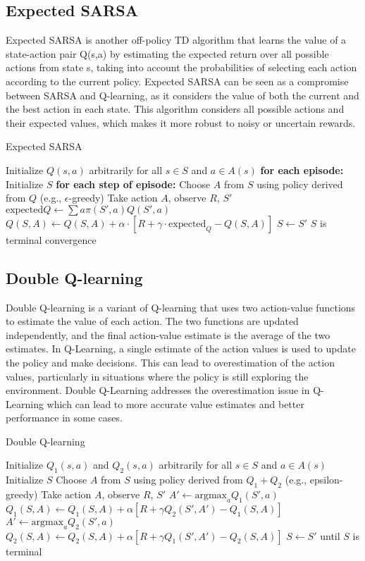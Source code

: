 \subsection{Expected SARSA}
Expected SARSA is another off-policy TD algorithm that learns the value of a state-action pair Q(s,a) by estimating the expected return over all possible actions from state s, taking into account the probabilities of selecting each action according to the current policy. Expected SARSA can be seen as a compromise between SARSA and Q-learning, as it considers the value of both the current and the best action in each state. This algorithm considers all possible actions and their expected values, which makes it more robust to noisy or uncertain rewards. 
\begin{algorithm}
\caption{Expected SARSA}\label{algo:ES}
\begin{algorithmic}[1]
\State Initialize $Q(s,a)$ arbitrarily for all $s \in S$ and $a \in A(s)$
\Repeat \textbf{for each episode:}
\State Initialize $S$
\Repeat \textbf{for each step of episode:}
\State Choose $A$ from $S$ using policy derived from $Q$ (e.g., $\epsilon$-greedy)
\State Take action $A$, observe $R$, $S'$
\State $\text{expected}Q \gets \sum{a} \pi(S',a) Q(S',a)$
\State $Q(S,A) \gets Q(S,A) + \alpha \cdot [R + \gamma \cdot \text{expected}_Q - Q(S,A)]$
\State $S \gets S'$
\Until $S$ is terminal
\Until convergence
\end{algorithmic}
\end{algorithm}


\subsection{Double Q-learning}
Double Q-learning is a variant of Q-learning that uses two action-value functions to estimate the value of each action. The two functions are updated independently, and the final action-value estimate is the average of the two estimates. In Q-Learning, a single estimate of the action values is used to update the policy and make decisions. This can lead to overestimation of the action values, particularly in situations where the policy is still exploring the environment. Double Q-Learning addresses the overestimation issue in Q-Learning which can lead to more accurate value estimates and better performance in some cases.
\begin{algorithm}
\caption{Double Q-learning}\label{algo:DQL}
\begin{algorithmic}[1]
\State Initialize $Q_1(s,a)$ and $Q_2(s,a)$ arbitrarily for all $s \in S$ and $a \in A(s)$
\State Initialize $S$
\State Choose $A$ from $S$ using policy derived from $Q_1+Q_2$ (e.g., epsilon-greedy)
\State Take action $A$, observe $R$, $S'$
\State $A' \gets \text{argmax}_a Q_1(S',a)$
\State $Q_1(S,A) \gets Q_1(S,A) + \alpha [R + \gamma Q_2(S',A') - Q_1(S,A)]$
\Else
\State $A' \gets \text{argmax}_a Q_2(S',a)$
\State $Q_2(S,A) \gets Q_2(S,A) + \alpha [R + \gamma Q_1(S',A') - Q_2(S,A)]$
\EndIf
\State $S \gets S'$
\EndFor
\State until $S$ is terminal
\EndFor
\end{algorithmic}
\end{algorithm}